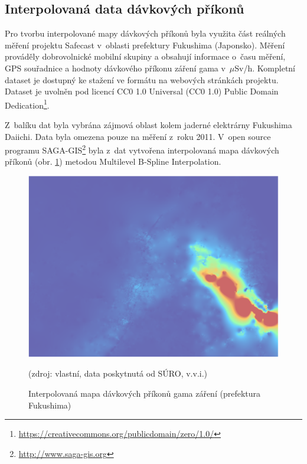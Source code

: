 \subsection{Interpolovaná data dávkových příkonů} Pro tvorbu
interpolované mapy dávkových příkonů byla využita část reálných měření
projektu Safecast v~oblasti prefektury Fukushima (Japonsko). Měření
prováděly dobrovolnické mobilní skupiny a obsahují informace o~času
měření, GPS souřadnice a hodnoty dávkového příkonu záření gama
v~$\mu$Sv/h. Kompletní dataset je dostupný ke stažení ve formátu
 na webových stránkách projektu. Dataset je uvolněn pod
licencí CC0 1.0 Universal (CC0 1.0) Public Domain
Dedication\footnote{\url{https://creativecommons.org/publicdomain/zero/1.0/}}.

Z~balíku dat byla vybrána zájmová oblast kolem jaderné elektrárny
Fukushima Daiichi. Data byla omezena pouze na měření z~roku
2011. V~open source programu
SAGA-GIS\footnote{\url{http://www.saga-gis.org}} byla z~dat
vytvořena interpolovaná mapa dávkových příkonů (obr. \ref{fig:interpolatedMap}) 
metodou Multilevel B-Spline
Interpolation.

\begin{figure}[H] \centering
    \includegraphics[scale=0.4]{./pictures/interpolovana_mapa.png}
      	\caption[Interpolovaná mapa dávkových příkonů (prefektura
Fukushima)]{Interpolovaná mapa dávkových příkonů gama záření
(prefektura Fukushima)}(zdroj: vlastní, data poskytnutá od SÚRO,
v.v.i.)
    	\label{fig:interpolatedMap}
\end{figure}

